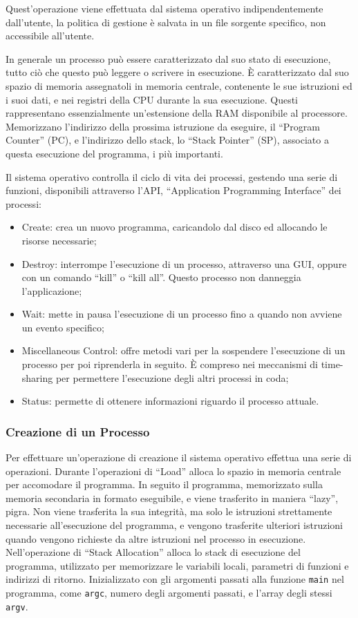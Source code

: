 \documentclass{article}
\numberwithin{equation}{subsection}
\begin{document}
Quest'operazione viene effettuata dal sistema operativo indipendentemente dall'utente, la politica di gestione è salvata in un file sorgente specifico, non accessibile 
all'utente. 


In generale un processo può essere caratterizzato dal suo stato di esecuzione, tutto ciò che questo può leggere o scrivere in esecuzione. \`{E} caratterizzato dal suo 
spazio di memoria assegnatoli in memoria centrale, contenente le sue istruzioni ed i suoi dati, e nei registri della CPU durante la sua esecuzione. Questi rappresentano 
essenzialmente un'estensione della RAM disponibile al processore. Memorizzano l'indirizzo della prossima istruzione da eseguire, il ``Program Counter'' (PC), e 
l'indirizzo dello stack, lo ``Stack Pointer'' (SP), associato a questa esecuzione del programma, i più importanti. 


Il sistema operativo controlla il ciclo di vita dei processi, gestendo una serie di funzioni, disponibili attraverso l'API, ``Application Programming Interface'' 
dei processi:
\begin{itemize}
	\item Create: crea un nuovo programma, caricandolo dal disco ed allocando le risorse necessarie;
	\item Destroy: interrompe l'esecuzione di un processo, attraverso una GUI, oppure con un comando ``kill'' o ``kill all''. Questo processo non danneggia l'applicazione;
	\item Wait: mette in pausa l'esecuzione di un processo fino a quando non avviene un evento specifico;
	\item Miscellaneous Control: offre metodi vari per la sospendere l'esecuzione di un processo per poi riprenderla in seguito. \`{E} compreso nei meccanismi di time-sharing per permettere l'esecuzione degli altri processi in coda;
	\item Status: permette di ottenere informazioni riguardo il processo attuale.  
\end{itemize}

\subsubsection{Creazione di un Processo}

Per effettuare un'operazione di creazione il sistema operativo effettua una serie di operazioni. Durante l'operazioni di ``Load'' alloca lo spazio in memoria centrale per accomodare il programma. In seguito il programma, memorizzato 
sulla memoria secondaria in formato eseguibile, e viene trasferito in maniera ``lazy'', pigra. Non viene trasferita la sua integrità, ma solo le istruzioni 
strettamente necessarie all'esecuzione del programma, e vengono trasferite ulteriori istruzioni quando vengono richieste da altre istruzioni nel processo in 
esecuzione. 
Nell'operazione di ``Stack Allocation'' alloca lo stack di esecuzione del programma, utilizzato per memorizzare le variabili locali, parametri di funzioni e indirizzi 
di ritorno. 
Inizializzato con gli argomenti passati alla funzione \verb|main| nel programma, come \verb|argc|, numero degli argomenti passati, e l'array degli stessi \verb|argv|. 
\end{document}
